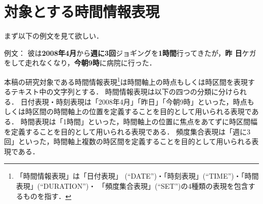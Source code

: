 \documentclass[japanese]{jnlp_1.4}
\newcommand{\modified}[1]{}
\def\timexiii{}
\begin{document}
\modified{我々のグループは 2006年より TimeML 開発者から TimeML 関連の情
報を得ながら時間情報表現アノテーションと事象表現アノテーションに取り組んできた．
標準化に適した時間情報表現アノテーションと，標準化に適さない事象表現アノテーションを切り分けたうえで，前者について ISO-TimeML に準拠する日本語版 \timexiii
アノテーション基準を検討し策定した．この部分が本研究の内容に相当する．
一方，後者についてはモダリティが豊かな日本
語の事象表現を国際標準に合わせてアノテーションすることが困難であり，別の方策でア
ノテーションすることを検討中である．}

\modified{日本において，国際標準に準拠している他のアノテーションデータとして，
策定中の SemAF-NE Named Entities（ISO-24617-3 制定中）に準拠している
BCCWJ に対する拡張固有表現体系アノテーション\cite{Hashimoto-2010}がある．}


\section{対象とする時間情報表現}

まず以下の例文を見て欲しい．

{\addtolength{\linewidth}{-6zw}\setlength{\leftskip}{3zw}
\begin{itembox}[l]{例文：}
{\small
彼は{\bf 2008年4月}から{\bf 週に3回}ジョギングを{\bf 1時間}行ってきたが，{\bf 昨
日}ケガをして走れなくなり，{\bf 今朝9時}に病院に行った．}
\end{itembox}
\par}

本稿の研究対象である時間情報表現\footnote{「時間情報表現」は「日付表現」
  (``DATE'')・「時刻表現」(``TIME'')・「時間表現」(``DURATION'')・
  「頻度集合表現」(``SET'')の4種類の表現を包含するものを指す．}は時間軸上の時点もしくは時区間を表現するテキスト中の文字列とする．
時間情報表現は以下の四つの分類に分けられる．
日付表現・時刻表現は「2008年4月」「昨日」「今朝9時」といった，時点もしくは時区間の時間軸上の位置を定義することを目的として用いられる表現である．
時間表現は「1時間」といった，時間軸上の位置に焦点をあてずに時区間幅を定義することを目的として用いられる表現である．
頻度集合表現は「週に3回」といった，時間軸上複数の時区間を定義することを目的として用いられる表現である．
\end{document}
